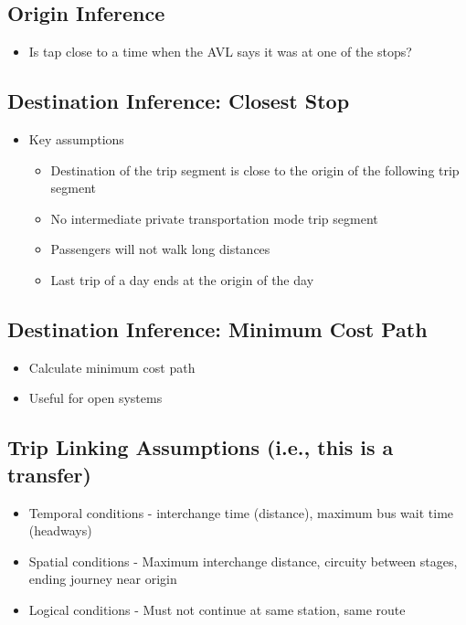 \documentclass[11pt]{article}
\begin{document}
\subsection{Origin Inference}
\label{sec:orgd54f7ea}
\begin{itemize}
\item Is tap close to a time when the AVL says it was at one of the stops?
\end{itemize}
\subsection{Destination Inference: Closest Stop}
\label{sec:org54a8066}
\begin{itemize}
\item Key assumptions
\begin{itemize}
\item Destination of the trip segment is close to the origin of the following trip segment
\item No intermediate private transportation mode trip segment
\item Passengers will not walk long distances
\item Last trip of a day ends at the origin of the day
\end{itemize}
\end{itemize}
\subsection{Destination Inference: Minimum Cost Path}
\label{sec:org2059bfc}
\begin{itemize}
\item Calculate minimum cost path
\item Useful for open systems
\end{itemize}
\subsection{Trip Linking Assumptions (i.e., this is a transfer)}
\label{sec:orgccde0fd}
\begin{itemize}
\item Temporal conditions - interchange time (distance), maximum bus wait time (headways)
\item Spatial conditions - Maximum interchange distance, circuity between stages, ending journey near origin
\item Logical conditions - Must not continue at same station, same route
\end{itemize}
\end{document}
